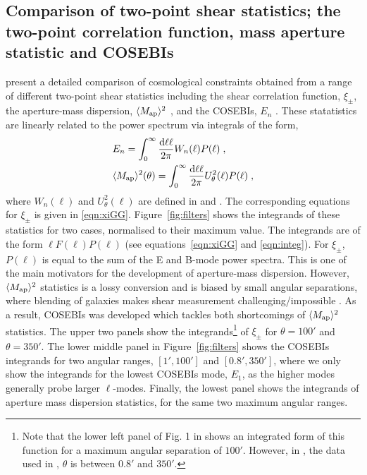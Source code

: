 \subsection{Comparison of two-point shear statistics; the two-point correlation function, mass aperture statistic and COSEBIs}
\citet{kilbinger/etal:2013} present a detailed comparison of cosmological constraints obtained from a range of different two-point shear statistics including the shear correlation function, $\xi_\pm$, the aperture-mass dispersion, $\langle M_ {\rm ap} \rangle ^2$ \citep{schneider/etal:1998}, and the COSEBIs, $E_n$ \citep{schneider/etal:2010}.  These statatistics are linearly related to the power spectrum via integrals of the form,
%
\begin{align}
\label{eqn:integ}
& E_n =\int_0^{\infty}\frac{{\rm d} \ell \ell}{2\pi} W_n(\ell) P(\ell)\;,\\ \nonumber
& \langle M_ {\rm ap} \rangle ^2(\theta)=\int_0^{\infty}\frac{{\rm d} \ell \ell}{2\pi} U^2_\theta(\ell) P(\ell)\;,
\end{align}
%
where $W_n(\ell)$ and $U^2_\theta(\ell)$ are defined in \cite{schneider/etal:2010} and \cite{schneider/etal:1998}. The corresponding equations for $\xi_\pm$ is given in \eqref{eqn:xiGG}.
Figure~\ref{fig:filters} shows the integrands of these statistics 
for two cases, normalised to their maximum value. 
The integrands are of the form $\ell F(\ell) P(\ell)$ (see equations~\ref{eqn:xiGG} and \ref{eqn:integ}). For $\xi_\pm$, $P(\ell)$ is equal to the sum of the E and B-mode power spectra. This is one of the main motivators for the development of aperture-mass dispersion. However, $\langle M_ {\rm ap} \rangle ^2$ statistics is a lossy conversion and is biased by small angular separations, where blending of galaxies makes shear measurement challenging/impossible \citep{kilbinger/etal:2006}. As a result, COSEBIs was developed which tackles both shortcomings of $\langle M_ {\rm ap} \rangle ^2$ statistics.
The upper two panels show the integrands\footnote{Note that the lower left panel of Fig. 1 in \citet{kitching/etal:2016} shows an integrated form of this function for a maximum angular separation of $100'$. However, in \citet{kilbinger/etal:2013}, the data used in \citet{kitching/etal:2016}, $\theta$ is between $0.8'$ and $350'$.} of $\xi_\pm$ for $\theta=100'$ and $\theta=350'$. The lower middle panel in Figure~\ref{fig:filters} shows the COSEBIs integrands for two angular ranges, $[1',100']$ and $[0.8',350']$, where we only show the integrands for the lowest COSEBIs mode, $E_1$, as the higher modes generally probe larger $\ell$-modes.  Finally, the lowest panel shows the integrands of aperture mass dispersion statistics, for the same two maximum angular ranges. 

